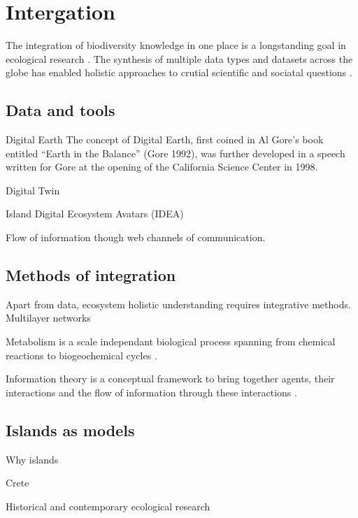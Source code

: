 \section{Intergation}
\label{sec:crete-integration}

The integration of biodiversity knowledge in one place is a longstanding
goal in ecological research \citep{Walter_2012}. The synthesis of multiple
data types and datasets across the globe has enabled 
holistic approaches to crutial scientific and sociatal questions \citep{heberling_j_mason_data_2021}.

\subsection{Data and tools}
\label{sec:data-tools}

Digital Earth
The concept of Digital Earth, first coined in Al Gore’s book entitled 
“Earth in the Balance” (Gore 1992), was further developed in a speech
written for Gore at the opening of the California Science Center in 1998.

Digital Twin

Island Digital Ecosystem Avatars (IDEA)

Flow of information though web channels of communication.

\subsection{Methods of integration}
\label{sec:meth-int}

Apart from data, ecosystem holistic understanding requires integrative methods.
Multilayer networks \citep{marine-multilayers}

Metabolism is a scale independant biological process spanning from chemical reactions
to biogeochemical cycles \citep{hall2018understanding}. 

Information theory is a conceptual framework to bring together agents,
their interactions and the flow of information through these interactions \citep{oconnor-information-ecology}.


\subsection{Islands as models}
\label{sec:island-model}

Why islands

Crete 

Historical and contemporary ecological research
